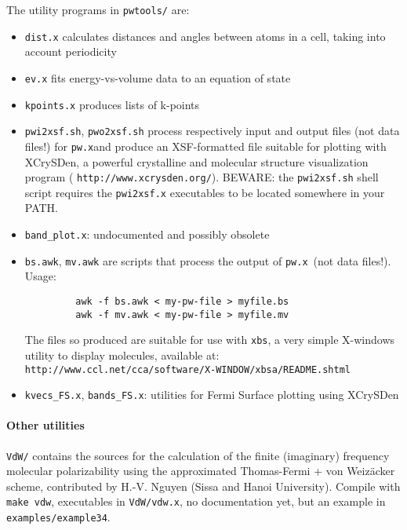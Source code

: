 \documentclass[12pt,a4paper]{article}
\def\pwx{\texttt{pw.x}}
\begin{document}
The utility programs in  \texttt{pwtools/} are:
\begin{itemize}
\item  \texttt{dist.x} calculates distances and angles between atoms in a cell,
  taking into account periodicity 
\item  \texttt{ev.x} fits energy-vs-volume data to an equation of state
\item  \texttt{kpoints.x} produces lists of k-points
\item  \texttt{pwi2xsf.sh},  \texttt{pwo2xsf.sh} process respectively input and output
  files (not data files!) for \pwx and produce an XSF-formatted file
  suitable for plotting with XCrySDen, a powerful crystalline and
  molecular structure visualization program
  ( \texttt{http://www.xcrysden.org/}). BEWARE: the  \texttt{pwi2xsf.sh} shell script
  requires the  \texttt{pwi2xsf.x} executables to be located somewhere in your PATH. 
\item  \texttt{band\_plot.x}: undocumented and possibly obsolete 
\item  \texttt{bs.awk},  \texttt{mv.awk} are scripts that process the output of \pwx\ (not
data files!). Usage: 
\begin{verbatim}
         awk -f bs.awk < my-pw-file > myfile.bs
         awk -f mv.awk < my-pw-file > myfile.mv
\end{verbatim}
The files so produced are suitable for use with  \texttt{xbs}, a very simple
X-windows utility to display molecules, available at:\\
 \texttt{http://www.ccl.net/cca/software/X-WINDOW/xbsa/README.shtml}
\item  \texttt{kvecs\_FS.x},  \texttt{bands\_FS.x}: utilities for Fermi Surface plotting
  using XCrySDen
\end{itemize}

\paragraph{Other utilities}
 \texttt{VdW/} contains the sources for the calculation of the finite (imaginary)
frequency molecular polarizability using the approximated Thomas-Fermi
+ von Weiz\"acker scheme, contributed by H.-V. Nguyen (Sissa and
Hanoi University). Compile with \texttt{make vdw}, executables in  
\texttt{VdW/vdw.x}, no
documentation yet, but an example in  \texttt{examples/example34}.
\end{document}
